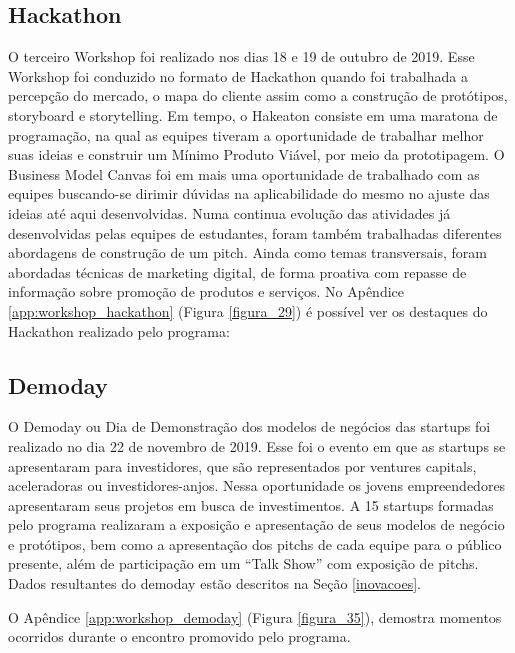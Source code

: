 \subsection{Hackathon}

O terceiro Workshop foi realizado nos dias 18 e 19 de outubro de 2019. Esse Workshop foi conduzido no formato de Hackathon quando foi trabalhada a percepção do mercado, o mapa do cliente assim como a construção de protótipos, storyboard e storytelling. Em tempo, o Hakeaton consiste em uma maratona de programação, na qual as equipes tiveram a oportunidade de trabalhar melhor suas ideias e construir um Mínimo Produto Viável, por meio da prototipagem. O Business Model Canvas foi em mais uma oportunidade de trabalhado com as equipes buscando-se dirimir dúvidas na aplicabilidade do mesmo no ajuste das ideias até aqui desenvolvidas.
Numa continua evolução das atividades já desenvolvidas pelas equipes de estudantes, foram também trabalhadas diferentes abordagens de construção de um pitch. Ainda como temas transversais, foram abordadas técnicas de marketing digital, de forma proativa com repasse de informação sobre promoção de produtos e serviços. No Apêndice \ref{app:workshop_hackathon} (Figura \ref{figura_29}) é possível ver os destaques do Hackathon realizado pelo programa:







\subsection{Demoday}

O Demoday ou Dia de Demonstração dos modelos de negócios das startups foi realizado no dia 22 de novembro de 2019. Esse foi o evento em que as startups se apresentaram para investidores, que são representados por ventures capitals, aceleradoras ou investidores-anjos. Nessa oportunidade os jovens empreendedores apresentaram seus projetos em busca de investimentos. A 15 startups formadas pelo programa realizaram a exposição e apresentação de seus modelos de negócio e protótipos, bem como a apresentação dos pitchs de cada equipe para o público presente, além de participação em um “Talk Show” com exposição de pitchs. Dados resultantes do demoday estão descritos na Seção \ref{inovacoes}. 

O Apêndice \ref{app:workshop_demoday} (Figura \ref{figura_35}), demostra momentos ocorridos durante o encontro promovido pelo programa.


